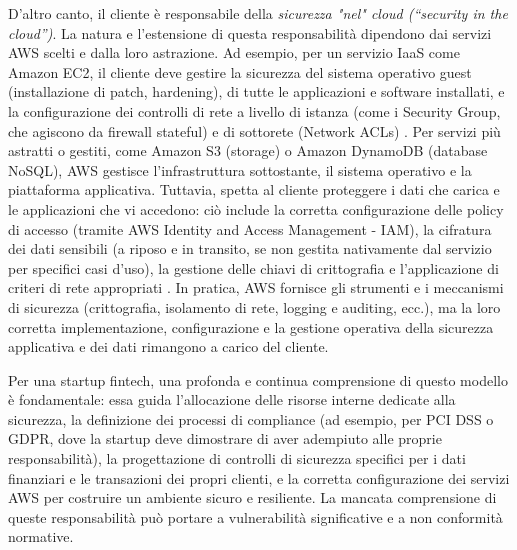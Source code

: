 D'altro canto, il cliente è responsabile della \textit{sicurezza "nel" cloud (“security in the cloud”)}. La natura e l'estensione di questa responsabilità dipendono dai servizi AWS scelti e dalla loro astrazione. Ad esempio, per un servizio IaaS come Amazon EC2, il cliente deve gestire la sicurezza del sistema operativo guest (installazione di patch, hardening), di tutte le applicazioni e software installati, e la configurazione dei controlli di rete a livello di istanza (come i Security Group, che agiscono da firewall stateful) e di sottorete (Network ACLs) \cite{aws-shared-responsibility}. Per servizi più astratti o gestiti, come Amazon S3 (storage) o Amazon DynamoDB (database NoSQL), AWS gestisce l'infrastruttura sottostante, il sistema operativo e la piattaforma applicativa. Tuttavia, spetta al cliente proteggere i dati che carica e le applicazioni che vi accedono: ciò include la corretta configurazione delle policy di accesso (tramite AWS Identity and Access Management - IAM), la cifratura dei dati sensibili (a riposo e in transito, se non gestita nativamente dal servizio per specifici casi d'uso), la gestione delle chiavi di crittografia e l'applicazione di criteri di rete appropriati \cite{aws-shared-responsibility}. In pratica, AWS fornisce gli strumenti e i meccanismi di sicurezza (crittografia, isolamento di rete, logging e auditing, ecc.), ma la loro corretta implementazione, configurazione e la gestione operativa della sicurezza applicativa e dei dati rimangono a carico del cliente.

Per una startup fintech, una profonda e continua comprensione di questo modello è fondamentale: essa guida l'allocazione delle risorse interne dedicate alla sicurezza, la definizione dei processi di compliance (ad esempio, per PCI DSS o GDPR, dove la startup deve dimostrare di aver adempiuto alle proprie responsabilità), la progettazione di controlli di sicurezza specifici per i dati finanziari e le transazioni dei propri clienti, e la corretta configurazione dei servizi AWS per costruire un ambiente sicuro e resiliente. La mancata comprensione di queste responsabilità può portare a vulnerabilità significative e a non conformità normative.
